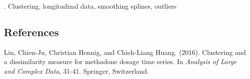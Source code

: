 \documentclass[12pt]{article}
\begin{document}
.
Clustering, longitudinal data,  smoothing splines,  outliers

\subsection*{References}

\begin{description}

\item
Lin, Chien-Ju, Christian Hennig, and Chieh-Liang Huang. (2016). Clustering and a dissimilarity measure for methadone dosage time series. In \textit{Analysis of Large and Complex Data}, 31-41. Springer, Switzerland. 

\end{description}
\end{document}
